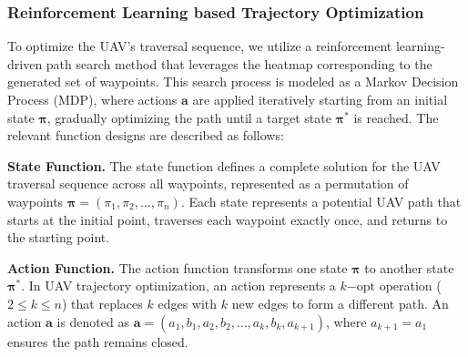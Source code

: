 \documentclass[sigconf]{acmart}
\begin{document}
\subsubsection{Reinforcement Learning based Trajectory Optimization }


To optimize the UAV's traversal sequence, we utilize a reinforcement learning-driven path search method that leverages the heatmap corresponding to the generated set of waypoints. This search process is modeled as a Markov Decision Process (MDP), where actions $\boldsymbol{a}$ are applied iteratively starting from an initial state $\boldsymbol{\pi}$, gradually optimizing the path until a target state $\boldsymbol{\pi^{*}}$ is reached. The relevant function designs are described as follows:


\textbf{State Function.} The state function defines a complete solution for the UAV traversal sequence across all waypoints, represented as a permutation of waypoints $\boldsymbol{\pi} = (\pi_{1},\pi_{2},\ldots,\pi_{n})$. Each state represents a potential UAV path that starts at the initial point, traverses each waypoint exactly once, and returns to the starting point.


\textbf{Action Function.} 
The action function transforms one state $\boldsymbol{\pi}$ to another state $\boldsymbol{\pi^{*}}$. In UAV trajectory optimization, an action represents a $k\mathrm{-opt}$ operation ($2 \leq k \leq n$) that replaces $k$ edges with $k$ new edges to form a different path. An action $\boldsymbol{a}$ is denoted as $\boldsymbol{a}=(a_{1},b_{1},a_{2},b_{2},\ldots,a_{k},b_{k},a_{k+1})$, where $a_{k+1} = a_{1}$ ensures the path remains closed. %
\end{document}
